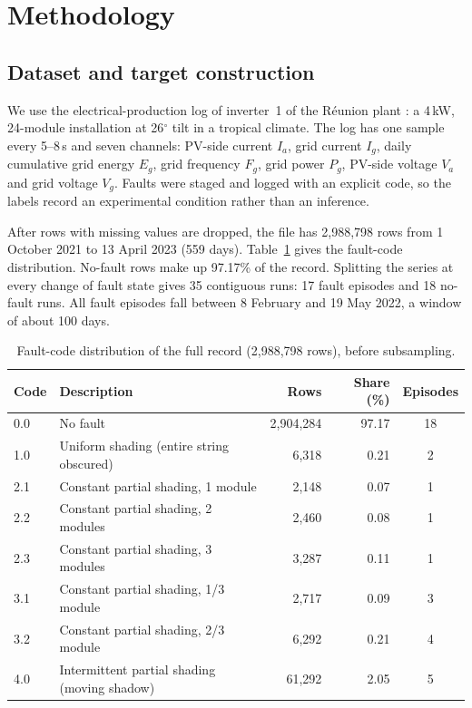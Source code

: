 \documentclass[11pt,a4paper]{article}
\begin{document}
\section{Methodology}

\subsection{Dataset and target construction}

We use the electrical-production log of inverter~1 of the R\'eunion plant \citep{Graillet2022}: a 4\,kW, 24-module installation at 26$^\circ$ tilt in a tropical climate. The log has one sample every 5--8\,s and seven channels: PV-side current $I_a$, grid current $I_g$, daily cumulative grid energy $E_g$, grid frequency $F_g$, grid power $P_g$, PV-side voltage $V_a$ and grid voltage $V_g$. Faults were staged and logged with an explicit code, so the labels record an experimental condition rather than an inference.

After rows with missing values are dropped, the file has 2{,}988{,}798 rows from 1 October 2021 to 13 April 2023 (559 days). Table~\ref{tab:codes} gives the fault-code distribution. No-fault rows make up 97.17\% of the record. Splitting the series at every change of fault state gives 35 contiguous runs: 17 fault episodes and 18 no-fault runs. All fault episodes fall between 8 February and 19 May 2022, a window of about 100 days.

\begin{table}[t]
\centering
\caption{Fault-code distribution of the full record (2{,}988{,}798 rows), before subsampling.}
\label{tab:codes}
\small
\begin{tabular}{@{}llrrc@{}}
\toprule
Code & Description & Rows & Share (\%) & Episodes \\
\midrule
0.0 & No fault & 2{,}904{,}284 & 97.17 & 18 \\
1.0 & Uniform shading (entire string obscured) & 6{,}318 & 0.21 & 2 \\
2.1 & Constant partial shading, 1 module & 2{,}148 & 0.07 & 1 \\
2.2 & Constant partial shading, 2 modules & 2{,}460 & 0.08 & 1 \\
2.3 & Constant partial shading, 3 modules & 3{,}287 & 0.11 & 1 \\
3.1 & Constant partial shading, 1/3 module & 2{,}717 & 0.09 & 3 \\
3.2 & Constant partial shading, 2/3 module & 6{,}292 & 0.21 & 4 \\
4.0 & Intermittent partial shading (moving shadow) & 61{,}292 & 2.05 & 5 \\
\bottomrule
\end{tabular}
\end{table}
\end{document}
